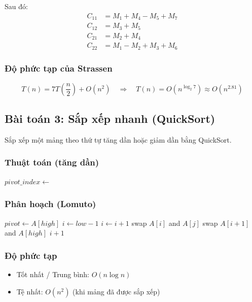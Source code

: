 \documentclass{article}
\begin{document}
Sau đó:
\[
\begin{aligned}
C_{11} &= M_1 + M_4 - M_5 + M_7 \\
C_{12} &= M_3 + M_5 \\
C_{21} &= M_2 + M_4 \\
C_{22} &= M_1 - M_2 + M_3 + M_6
\end{aligned}
\]

\subsubsection{Độ phức tạp của Strassen}
\[
T(n) = 7T\left(\frac{n}{2}\right) + O(n^2) \quad\Rightarrow\quad T(n) = O(n^{\log_2 7}) \approx O(n^{2.81})
\]

\subsection{Bài toán 3: Sắp xếp nhanh (QuickSort)}

Sắp xếp một mảng theo thứ tự tăng dần hoặc giảm dần bằng QuickSort.

\subsubsection{Thuật toán (tăng dần)}

\begin{algorithmic}[1]
        \State $pivot\_index \gets$ 
        \State {}
        \State {}
    \EndIf
\EndFunction
\end{algorithmic}

\subsubsection{Phân hoạch (Lomuto)}

\begin{algorithmic}[1]
    \State $pivot \gets A[high]$
    \State $i \gets low - 1$
            \State $i \gets i + 1$
            \State swap $A[i]$ and $A[j]$
        \EndIf
    \EndFor
    \State swap $A[i+1]$ and $A[high]$
    \State \Return $i+1$
\EndFunction
\end{algorithmic}

\subsubsection{Độ phức tạp}
\begin{itemize}
    \item Tốt nhất / Trung bình: \(O(n \log n)\)
    \item Tệ nhất: \(O(n^2)\) (khi mảng đã được sắp xếp)
\end{itemize}
\end{document}
